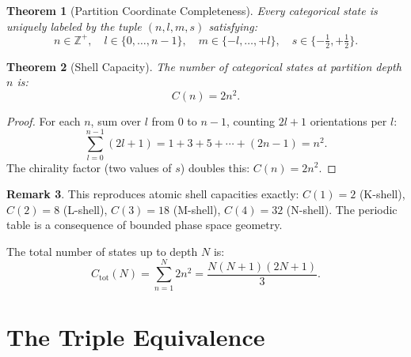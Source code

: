 \documentclass[twocolumn,10pt]{article}
\newtheorem{theorem}{Theorem}[section]
\theoremstyle{definition}
\newtheorem{remark}[theorem]{Remark}
\newcommand{\Z}{\mathbb{Z}}
\begin{document}
\begin{theorem}[Partition Coordinate Completeness]\label{thm:completeness}
Every categorical state is uniquely labeled by the tuple $(n, l, m, s)$ satisfying:
\begin{equation}\label{eq:partition_coords}
    n \in \Z^+, \quad l \in \{0,\ldots,n{-}1\}, \quad m \in \{-l,\ldots,+l\}, \quad s \in \{-\tfrac{1}{2},+\tfrac{1}{2}\}.
\end{equation}
\end{theorem}

\begin{theorem}[Shell Capacity]\label{thm:capacity}
The number of categorical states at partition depth $n$ is:
\begin{equation}\label{eq:capacity}
    \boxed{C(n) = 2n^2.}
\end{equation}
\end{theorem}

\begin{proof}
For each $n$, sum over $l$ from 0 to $n{-}1$, counting $2l+1$ orientations per $l$:
\begin{equation}
    \sum_{l=0}^{n-1}(2l+1) = 1 + 3 + 5 + \cdots + (2n-1) = n^2.
\end{equation}
The chirality factor (two values of $s$) doubles this: $C(n) = 2n^2$.
\end{proof}

\begin{remark}
This reproduces atomic shell capacities exactly: $C(1) = 2$ (K-shell), $C(2) = 8$ (L-shell), $C(3) = 18$ (M-shell), $C(4) = 32$ (N-shell). The periodic table is a consequence of bounded phase space geometry.
\end{remark}

The total number of states up to depth $N$ is:
\begin{equation}\label{eq:cumulative}
    C_{\mathrm{tot}}(N) = \sum_{n=1}^{N} 2n^2 = \frac{N(N+1)(2N+1)}{3}.
\end{equation}

\section{The Triple Equivalence}\label{sec:triple_equiv}
\end{document}
